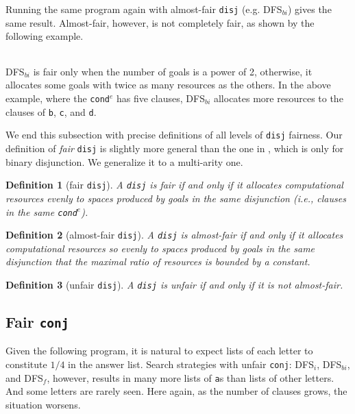 \documentclass[acmlarge]{acmart}
\newcommand{\conde}{\texttt{cond$^e$}}
\newcommand{\conj}{\texttt{conj}}
\newcommand{\disj}{\texttt{disj}}
\newcommand{\DFSi }[0]{DFS$_{i}$}
\newcommand{\DFSf }[0]{DFS$_{f}$}
\newcommand{\DFSbi}[0]{DFS$_{bi}$}
\newtheorem{defn}{Definition}[section]
\begin{document}
Running the same program again with almost-fair \disj {} (e.g. 
\DFSbi{}) gives the same result. Almost-fair, however, is not 
completely fair, as shown by the following example. 

\begin{center}
	\begin{tabular}{c}
		
	\end{tabular}
\end{center}

\DFSbi{} is fair only when the number of goals is a power of 2, 
otherwise, it allocates some goals with twice as many resources as the 
others. In the above example, where the \conde{} has five clauses, \DFSbi{} 
allocates more resources to the clauses of \texttt{b}, \texttt{c}, and 
\texttt{d}.

We end this subsection with precise definitions of all levels of 
\disj{} fairness. Our definition of \emph{fair} \disj{} is slightly 
more general
than the one in \citet{seres1999algebra}, which is only
for binary disjunction. We generalize it to a multi-arity one.

\begin{defn}[fair \disj{}]
A \disj{} is fair if and only if it allocates computational resources evenly to 
spaces produced by goals in the same disjunction 
(i.e., clauses in the same \conde).
\end{defn}

\begin{defn}[almost-fair \disj{}]
A \disj{} is almost-fair if and only if it allocates computational resources
so evenly to spaces produced by goals in the same disjunction that 
the maximal ratio of resources is bounded by a constant.
\end{defn}

\begin{defn}[unfair \disj{}]
A \disj{} is unfair if and only if it is not almost-fair.
\end{defn}

\subsection{Fair \texttt{conj}}
\label{sec:fairconj}

Given the following program, it is natural to expect lists of each letter to
constitute $1/4$ in the answer list. Search strategies with unfair \conj{}:
\DFSi, \DFSbi, and \DFSf, however, results in many more lists of \texttt{a}s 
than 
lists of other letters. And some letters are rarely seen. Here again, as the
number of clauses grows, the situation worsens. 
\end{document}
